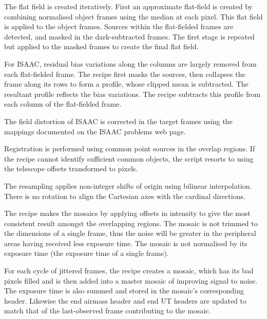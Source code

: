 \documentclass[twoside,11pt]{article}
\newcommand{\htmladdnormallink}[2]{#1}
\renewcommand{\_}{\texttt{\symbol{95}}}
\newcommand{\sstitem}{\item}
\begin{document}
{{{         \sstitem
         The flat field is created iteratively.  First an approximate
         flat-field is created by combining normalised object frames using
         the median at each pixel.  This flat field is applied to the object
         frames.  Sources within the flat-fielded frames are detected, and
         masked in the dark-subtracted frames.  The first stage is repeated
         but applied to the masked frames to create the final flat field.

         \sstitem
         For ISAAC, residual bias variations along the columns are
         largely removed from each flat-fielded frame.  The recipe first
         masks the sources, then collapses the frame along its rows to form
         a profile, whose clipped mean is subtracted.  The resultant profile
         reflects the bias variations.  The recipe subtracts this profile
         from each column of the flat-fielded frame.

         \sstitem
         The field distortion of ISAAC is corrected in the target frames
         using the mappings documented on the 
         \htmladdnormallink{ISAAC problems web page}
         {http://www.eso.org/instruments/isaac/problems_tips.html}.

         \sstitem
         Registration is performed using common point sources in the
         overlap regions.  If the recipe cannot identify sufficient common
         objects, the script resorts to using the telescope offsets
         transformed to pixels.

         \sstitem
         The resampling applies non-integer shifts of origin using
         bilinear interpolation.  There is no rotation to align the
         Cartesian axes with the cardinal directions.

         \sstitem
         The recipe makes the mosaics by applying offsets in intensity
         to give the most consistent result amongst the overlapping regions.
         The mosaic is not trimmed to the dimensions of a single frame, thus
         the noise will be greater in the peripheral areas having received
         less exposure time.  The mosaic is not normalised by its exposure
         time (the exposure time of a single frame).

         \sstitem
         For each cycle of jittered frames, the recipe creates a mosaic,
         which has its bad pixels filled and is then added into a master
         mosaic of improving signal to noise.  The exposure time is also
         summed and stored in the mosaic's corresponding header.  Likewise 
         the end airmass header and end UT headers are updated to match that
         of the last-observed frame contributing to the mosaic.

}}}
\end{document}
